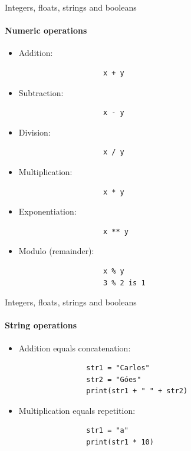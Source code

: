 \documentclass[notes,11pt, aspectratio=169, xcolor=table]{beamer}
\begin{document}
    \begin{frame}[fragile=singleslide]{Integers, floats, strings and booleans}
    \framesubtitle{Numeric operations}

        \begin{itemize}
            \item Addition:
                \begin{verbatim}
                    x + y
                \end{verbatim}    
            \item Subtraction:
                \begin{verbatim}
                    x - y
                \end{verbatim}    
            \item Division:
                \begin{verbatim}
                    x / y
                \end{verbatim}    
            \item Multiplication:
                \begin{verbatim}
                    x * y
                \end{verbatim}    
            \item Exponentiation:
                \begin{verbatim}
                    x ** y
                \end{verbatim}    
            \item Modulo (remainder):
                \begin{verbatim}
                    x % y
                    3 % 2 is 1
                \end{verbatim}    
        \end{itemize}

    \end{frame}      

    \begin{frame}[fragile=singleslide]{Integers, floats, strings and booleans}
    \framesubtitle{String operations}

        \begin{itemize}
            \item Addition equals concatenation:
                \begin{verbatim}
                str1 = "Carlos"
                str2 = "Góes"
                print(str1 + " " + str2)
                \end{verbatim}    
            \item Multiplication equals repetition:
                \begin{verbatim}
                str1 = "a"
                print(str1 * 10)
                \end{verbatim}    
        \end{itemize}

    \end{frame}          
\end{document}
